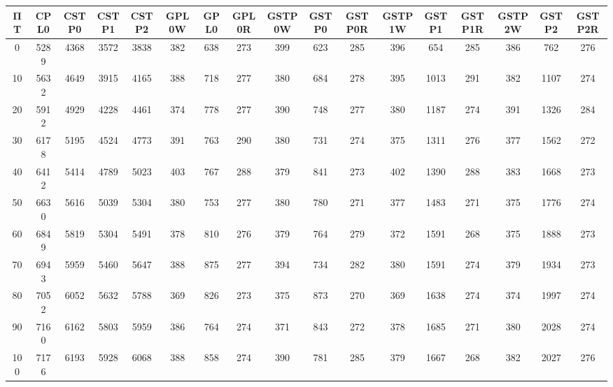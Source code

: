 \begin{tabular}{|c|c|c|c|c|c|c|c|c|c|c|c|c|c|c|c|c|}
\hline
ΠΤ&CPL0&CSTP0&CSTP1&CSTP2&GPL0W&GPL0&GPL0R&GSTP0W&GSTP0&GSTP0R&GSTP1W&GSTP1&GSTP1R&GSTP2W&GSTP2&GSTP2R\\
\hline
\hline
0&5289&4368&3572&3838&382&638&273&399&623&285&396&654&285&386&762&276\\
\hline
10&5632&4649&3915&4165&388&718&277&380&684&278&395&1013&291&382&1107&274\\
\hline
20&5912&4929&4228&4461&374&778&277&390&748&277&380&1187&274&391&1326&284\\
\hline
30&6178&5195&4524&4773&391&763&290&380&731&274&375&1311&276&377&1562&272\\
\hline
40&6412&5414&4789&5023&403&767&288&379&841&273&402&1390&288&383&1668&273\\
\hline
50&6630&5616&5039&5304&380&753&277&380&780&271&377&1483&271&375&1776&274\\
\hline
60&6849&5819&5304&5491&378&810&276&379&764&279&372&1591&268&375&1888&273\\
\hline
70&6943&5959&5460&5647&388&875&277&394&734&282&380&1591&274&379&1934&273\\
\hline
80&7052&6052&5632&5788&369&826&273&375&873&270&369&1638&274&374&1997&274\\
\hline
90&7160&6162&5803&5959&386&764&274&371&843&272&378&1685&271&380&2028&274\\
\hline
100&7176&6193&5928&6068&388&858&274&390&781&285&379&1667&268&382&2027&276\\
\hline
\end{tabular}
